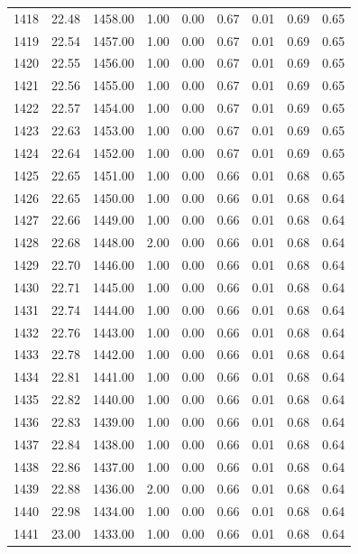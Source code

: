 \documentclass{article}\usepackage[]{graphicx}\usepackage[]{color}
\begin{document}
\begin{longtable}{rrrrrrrrr}
  1418 & 22.48 & 1458.00 & 1.00 & 0.00 & 0.67 & 0.01 & 0.69 & 0.65 \\ 
  1419 & 22.54 & 1457.00 & 1.00 & 0.00 & 0.67 & 0.01 & 0.69 & 0.65 \\ 
  1420 & 22.55 & 1456.00 & 1.00 & 0.00 & 0.67 & 0.01 & 0.69 & 0.65 \\ 
  1421 & 22.56 & 1455.00 & 1.00 & 0.00 & 0.67 & 0.01 & 0.69 & 0.65 \\ 
  1422 & 22.57 & 1454.00 & 1.00 & 0.00 & 0.67 & 0.01 & 0.69 & 0.65 \\ 
  1423 & 22.63 & 1453.00 & 1.00 & 0.00 & 0.67 & 0.01 & 0.69 & 0.65 \\ 
  1424 & 22.64 & 1452.00 & 1.00 & 0.00 & 0.67 & 0.01 & 0.69 & 0.65 \\ 
  1425 & 22.65 & 1451.00 & 1.00 & 0.00 & 0.66 & 0.01 & 0.68 & 0.65 \\ 
  1426 & 22.65 & 1450.00 & 1.00 & 0.00 & 0.66 & 0.01 & 0.68 & 0.64 \\ 
  1427 & 22.66 & 1449.00 & 1.00 & 0.00 & 0.66 & 0.01 & 0.68 & 0.64 \\ 
  1428 & 22.68 & 1448.00 & 2.00 & 0.00 & 0.66 & 0.01 & 0.68 & 0.64 \\ 
  1429 & 22.70 & 1446.00 & 1.00 & 0.00 & 0.66 & 0.01 & 0.68 & 0.64 \\ 
  1430 & 22.71 & 1445.00 & 1.00 & 0.00 & 0.66 & 0.01 & 0.68 & 0.64 \\ 
  1431 & 22.74 & 1444.00 & 1.00 & 0.00 & 0.66 & 0.01 & 0.68 & 0.64 \\ 
  1432 & 22.76 & 1443.00 & 1.00 & 0.00 & 0.66 & 0.01 & 0.68 & 0.64 \\ 
  1433 & 22.78 & 1442.00 & 1.00 & 0.00 & 0.66 & 0.01 & 0.68 & 0.64 \\ 
  1434 & 22.81 & 1441.00 & 1.00 & 0.00 & 0.66 & 0.01 & 0.68 & 0.64 \\ 
  1435 & 22.82 & 1440.00 & 1.00 & 0.00 & 0.66 & 0.01 & 0.68 & 0.64 \\ 
  1436 & 22.83 & 1439.00 & 1.00 & 0.00 & 0.66 & 0.01 & 0.68 & 0.64 \\ 
  1437 & 22.84 & 1438.00 & 1.00 & 0.00 & 0.66 & 0.01 & 0.68 & 0.64 \\ 
  1438 & 22.86 & 1437.00 & 1.00 & 0.00 & 0.66 & 0.01 & 0.68 & 0.64 \\ 
  1439 & 22.88 & 1436.00 & 2.00 & 0.00 & 0.66 & 0.01 & 0.68 & 0.64 \\ 
  1440 & 22.98 & 1434.00 & 1.00 & 0.00 & 0.66 & 0.01 & 0.68 & 0.64 \\ 
  1441 & 23.00 & 1433.00 & 1.00 & 0.00 & 0.66 & 0.01 & 0.68 & 0.64 \\ 

\end{longtable}
\end{document}
